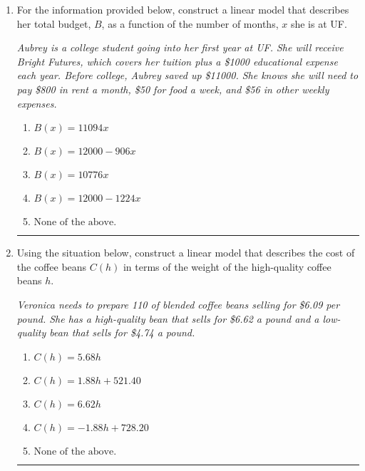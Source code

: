 \documentclass[14pt]{extbook}
\newcommand{\litem}[1]{\item#1\hspace*{-1cm}\rule{\textwidth}{0.4pt}}
\begin{document}
\begin{enumerate}
{\begin{enumerate}[label=\Alph*.]
\end{enumerate} }
\litem{
For the information provided below, construct a linear model that describes her total budget, $B$, as a function of the number of months, $x$ she is at UF.
\begin{center}
    \textit{ Aubrey is a college student going into her first year at UF. She will receive Bright Futures, which covers her tuition plus a \$1000 educational expense each year. Before college, Aubrey saved up \$11000. She knows she will need to pay \$800 in rent a month, \$50 for food a week, and \$56 in other weekly expenses. }
\end{center}
\begin{enumerate}[label=\Alph*.]
\item \( B(x) = 11094 x \)
\item \( B(x) = 12000 - 906 x \)
\item \( B(x) = 10776 x \)
\item \( B(x) = 12000 - 1224 x \)
\item \( \text{None of the above.} \)

\end{enumerate} }
\litem{
Using the situation below, construct a linear model that describes the cost of the coffee beans $C(h)$ in terms of the weight of the high-quality coffee beans $h$.
\begin{center}
    \textit{ Veronica needs to prepare 110 of blended coffee beans selling for \$6.09 per pound. She has a high-quality bean that sells for \$6.62 a pound and a low-quality bean that sells for \$4.74 a pound. }
\end{center}
\begin{enumerate}[label=\Alph*.]
\item \( C(h) = 5.68 h \)
\item \( C(h) = 1.88 h + 521.40 \)
\item \( C(h) = 6.62 h \)
\item \( C(h) = -1.88 h + 728.20 \)
\item \( \text{None of the above.} \)


\end{enumerate}}
\end{enumerate}
\end{document}
